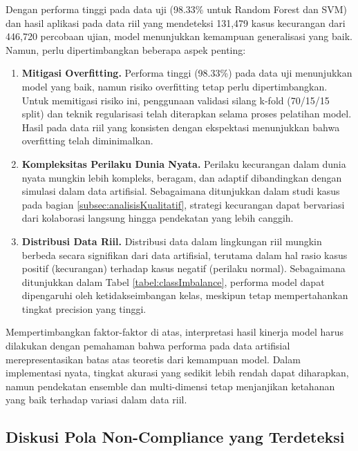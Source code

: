 Dengan performa tinggi pada data uji (98.33\% untuk Random Forest dan SVM) dan hasil aplikasi pada data riil yang mendeteksi 131,479 kasus kecurangan dari 446,720 percobaan ujian, model menunjukkan kemampuan generalisasi yang baik. Namun, perlu dipertimbangkan beberapa aspek penting:

\begin{enumerate}
    \item \textbf{Mitigasi Overfitting.} Performa tinggi (98.33\%) pada data uji menunjukkan model yang baik, namun risiko overfitting tetap perlu dipertimbangkan. Untuk memitigasi risiko ini, penggunaan validasi silang k-fold (70/15/15 split) dan teknik regularisasi telah diterapkan selama proses pelatihan model. Hasil pada data riil yang konsisten dengan ekspektasi menunjukkan bahwa overfitting telah diminimalkan.

    \item \textbf{Kompleksitas Perilaku Dunia Nyata.} Perilaku kecurangan dalam dunia nyata mungkin lebih kompleks, beragam, dan adaptif dibandingkan dengan simulasi dalam data artifisial. Sebagaimana ditunjukkan dalam studi kasus pada bagian \ref{subsec:analisisKualitatif}, strategi kecurangan dapat bervariasi dari kolaborasi langsung hingga pendekatan yang lebih canggih.

    \item \textbf{Distribusi Data Riil.} Distribusi data dalam lingkungan riil mungkin berbeda secara signifikan dari data artifisial, terutama dalam hal rasio kasus positif (kecurangan) terhadap kasus negatif (perilaku normal). Sebagaimana ditunjukkan dalam Tabel \ref{tabel:classImbalance}, performa model dapat dipengaruhi oleh ketidakseimbangan kelas, meskipun tetap mempertahankan tingkat precision yang tinggi.
\end{enumerate}

Mempertimbangkan faktor-faktor di atas, interpretasi hasil kinerja model harus dilakukan dengan pemahaman bahwa performa pada data artifisial merepresentasikan batas atas teoretis dari kemampuan model. Dalam implementasi nyata, tingkat akurasi yang sedikit lebih rendah dapat diharapkan, namun pendekatan ensemble dan multi-dimensi tetap menjanjikan ketahanan yang baik terhadap variasi dalam data riil.

\subsection{Diskusi Pola Non-Compliance yang Terdeteksi}
\label{subsec:diskusiPolaNonCompliance}


